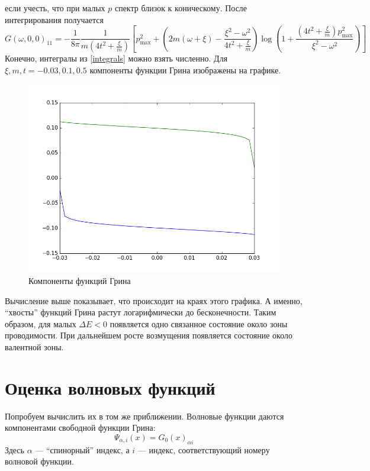 \documentclass{article}
\begin{document}
если учесть, что при малых $p$ спектр близок к 
коническому. После интегрирования получается
\begin{equation}
    G(\omega,0,0)_{11} = -\frac{1}{8\pi}\frac{1}{m(4t^2 + \frac{\xi}{m})}
        \left[ p_{\mathrm{max}}^2 + 
            \left(2m(\omega+\xi) - \frac{\xi^2 - \omega^2}{4t^2 + \frac{\xi}{m}}\right) 
                \log{\left(1 + \frac{\left(4t^2 + \frac{\xi}{m}\right)p_{\mathrm{max}}^2}
                                    {\xi^2 - \omega^2}\right)}\right]
\end{equation}
Конечно, интегралы из \eqref{integrals} можно взять численно. Для 
$\xi, m, t = -0.03, 0.1, 0.5$ компоненты функции Грина изображены на графике.

\begin{figure}[h]
    \centering
    \includegraphics[width=0.8\linewidth]{green_functions.png}
    \caption{Компоненты функций Грина}
\end{figure}

Вычисление выше показывает, что происходит на краях этого графика. А именно, ``хвосты'' 
функций Грина растут логарифмически до бесконечности.
Таким образом, для малых $\Delta E < 0$ появляется одно связанное состояние около 
зоны проводимости. При дальнейшем росте возмущения появляется состояние около валентной зоны.

\section{Оценка волновых функций}
Попробуем вычислить их в том же приближении. Волновые функции даются компонентами свободной
функции Грина:
\begin{equation}
    \Psi_{\alpha, i}(x) = G_0(x)_{\alpha i}
\end{equation}
Здесь $\alpha$ --- ``спинорный'' индекс, а $i$ --- индекс, соответствующий номеру волновой 
функции.
\end{document}
